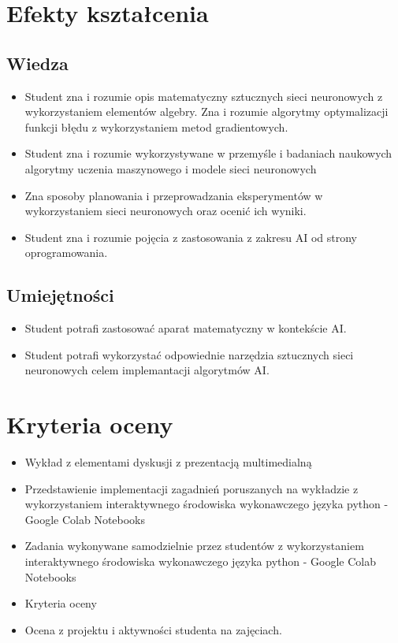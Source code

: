 \documentclass[12pt, a4paper]{article}
\begin{document}
\section{Efekty kształcenia}

\subsection*{Wiedza}
\begin{itemize}
  \item Student zna i rozumie opis matematyczny sztucznych sieci neuronowych z wykorzystaniem elementów algebry. Zna i rozumie algorytmy optymalizacji funkcji błędu z wykorzystaniem metod gradientowych.
  \item Student zna i rozumie wykorzystywane w przemyśle i badaniach naukowych algorytmy uczenia maszynowego i modele sieci neuronowych
  \item Zna sposoby  planowania i przeprowadzania eksperymentów w wykorzystaniem sieci neuronowych oraz ocenić ich wyniki.
  \item Student zna i rozumie pojęcia z zastosowania z zakresu AI od strony oprogramowania.
\end{itemize}

\subsection*{Umiejętności}
\begin{itemize}
  \item Student potrafi zastosować aparat matematyczny w kontekście AI.
  \item Student potrafi wykorzystać odpowiednie narzędzia sztucznych sieci neuronowych celem implemantacji algorytmów AI.
\end{itemize}

\section{Kryteria oceny}

\begin{itemize}
  \item Wykład z elementami dyskusji z prezentacją multimedialną
  \item Przedstawienie implementacji zagadnień poruszanych na wykładzie z wykorzystaniem interaktywnego środowiska wykonawczego języka python - Google Colab Notebooks
  \item Zadania wykonywane samodzielnie przez studentów z wykorzystaniem interaktywnego środowiska wykonawczego języka python - Google Colab Notebooks
  \item Kryteria oceny
  \item Ocena z projektu i aktywności studenta na zajęciach.
\end{itemize}
\end{document}
